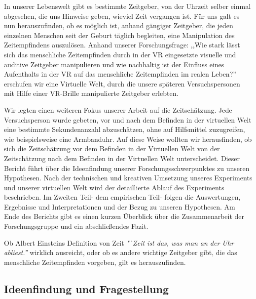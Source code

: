 \documentclass{Bericht}
\begin{document}
	In unserer Lebenswelt gibt es bestimmte Zeitgeber, von der Uhrzeit selber einmal abgesehen, die uns Hinweise geben, wieviel Zeit vergangen ist. Für uns galt es nun herauszufinden, ob es möglich ist, anhand gängiger Zeitgeber, die jeden einzelnen Menschen seit der Geburt täglich begleiten, eine Manipulation des Zeitempfindens auszulösen. Anhand unserer Forschungsfrage: ,,Wie stark lässt sich das menschliche
Zeitempfinden durch in der VR eingesetzte visuelle und auditive Zeitgeber manipulieren und
wie nachhaltig ist der Einfluss eines Aufenthalts in der VR auf das menschliche Zeitempfinden
im realen Leben?'' erschufen wir eine Virtuelle Welt, durch die unsere späteren Versuchspersonen mit Hilfe einer VR-Brille manipulierte Zeitgeber erlebten. 

	 Wir legten einen weiteren Fokus unserer Arbeit auf die Zeitschätzung. Jede Versuchsperson wurde gebeten, vor und nach dem Befinden in der virtuellen Welt eine bestimmte Sekundenanzahl abzuschätzen, ohne auf Hilfsmittel zuzugreifen, wie beispielsweise eine Armbanduhr. Auf diese Weise wollten wir herausfinden, ob sich die Zeitschätzung vor dem Befinden in der Virtuellen Welt von der Zeitschätzung nach dem Befinden in der Virtuellen Welt unterscheidet.
Dieser Bericht führt über die Ideenfindung unserer Forschungsschwerpunktes zu unseren Hypothesen. Nach der technischen und kreativen Umsetzung unseres Experiments und unserer virtuellen Welt wird der detaillierte Ablauf des Experiments beschrieben. Im Zweiten Teil- dem empirischen Teil- folgen die Auswertungen, Ergebnisse und Interpretationen und der Bezug zu unseren Hypothesen. Am Ende des Berichts gibt es einen kurzen Überblick über die Zusammenarbeit der Forschungsgruppe und ein abschließendes Fazit. 

	Ob  Albert Einsteins Definition von Zeit \textit{"`Zeit ist das, was man an der Uhr abliest.'' } wirklich ausreicht, oder ob es andere wichtige Zeitgeber gibt, die das menschliche Zeitempfinden vorgeben, gilt es herauszufinden. 

\label{subsec:ideenfindung}
\subsection{Ideenfindung und Fragestellung}
\end{document}
